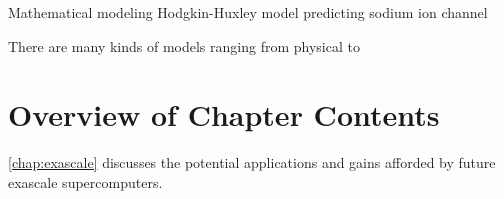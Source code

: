 \par Mathematical modeling Hodgkin-Huxley model predicting sodium ion channel\cite{Sigg2014a}


There are many kinds of models ranging from physical to

\par

\section{Overview of Chapter Contents}

\par \cref{chap:exascale} discusses the potential applications and gains afforded by future exascale supercomputers.

